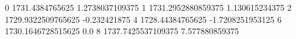 0 1731.4384765625 1.2738037109375
1 1731.2952880859375 1.130615234375
2 1729.9322509765625 -0.232421875
4 1728.44384765625 -1.7208251953125
6 1730.1646728515625 0.0
8 1737.7425537109375 7.577880859375
